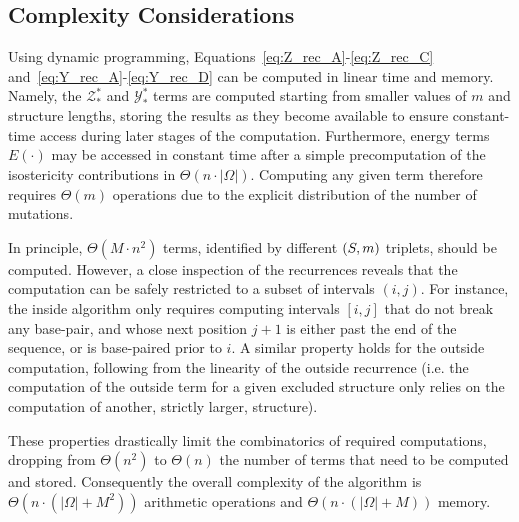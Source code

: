 \subsection{Complexity Considerations}
Using dynamic programming, Equations~\eqref{eq:Z_rec_A}-\eqref{eq:Z_rec_C} and~\eqref{eq:Y_rec_A}-\eqref{eq:Y_rec_D} can be computed in linear time and memory. Namely, the $\mathcal{Z}^{*}_{*}$ and $\mathcal{Y}^{*}_{*}$ terms are computed starting from smaller values of $m$ and structure lengths, storing the results as they become available to ensure constant-time access during later stages of the computation. Furthermore, energy terms $E(\cdot)$ may be accessed in constant time after a simple precomputation of the isostericity contributions in $\Theta(n\cdot|\Omega|)$. Computing any given term therefore requires $\Theta(m)$ operations due to the explicit distribution of the number of mutations.

In principle, $\Theta(M\cdot n^2)$ terms, identified by different $(S,m)$ triplets, should be computed.
However, a close inspection of the recurrences reveals that the computation can be safely restricted to a subset of intervals $(i,j)$.
For instance, the inside algorithm only requires computing intervals $[i,j]$ that do not break any base-pair, and whose next position $j+1$ is either past the end of the sequence, or is base-paired prior to $i$. A similar property holds for the outside computation,  following from the linearity of the outside recurrence (i.e. the computation of the outside term for a given excluded structure only relies on the computation of another, strictly larger, structure).
 
These properties drastically limit the combinatorics of required computations, dropping from $\Theta(n^2)$ to $\Theta(n)$ the number of terms that need to be computed and stored. Consequently the overall complexity of the algorithm is $\Theta(n\cdot(|\Omega|+M^2))$ arithmetic operations and $\Theta(n\cdot(|\Omega|+M))$ memory.
